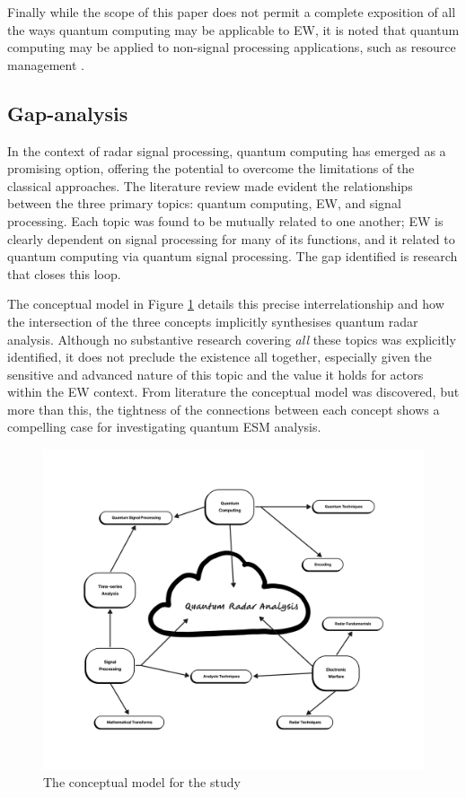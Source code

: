 Finally while the scope of this paper does not permit a complete exposition of all the ways quantum computing may be applicable to \ac{EW}, it is noted that quantum computing may be applied to non-signal processing applications, such as resource management \cite{charlish_autonomous_2011, charlish_development_2020}.

\subsection{Gap-analysis}

In the context of radar signal processing, quantum computing has emerged as a promising option, offering the potential to overcome the limitations of the classical approaches.
The literature review made evident the relationships between the three primary topics: quantum computing, \ac{EW}, and signal processing.
Each topic was found to be mutually related to one another; \ac{EW} is clearly dependent on signal processing for many of its functions, and it related to quantum computing via quantum signal processing.
The gap identified is research that closes this loop.

The conceptual model in Figure \ref{Fig:conceptual_model} details this precise interrelationship and how the intersection of the three concepts implicitly synthesises quantum radar analysis.
Although no substantive research covering \textit{all} these topics was explicitly identified, it does not preclude the existence all together, especially given the sensitive and advanced nature of this topic and the value it holds for actors within the \ac{EW} context.
From literature the conceptual model was discovered, but more than this, the tightness of the connections between each concept shows a compelling case for investigating quantum \ac{ESM} analysis.

\begin{figure}
    \centering
    \includegraphics[width=1\textwidth]{Figures/mind_map.png}
    \caption{The conceptual model for the study}
    \label{Fig:conceptual_model}
\end{figure}

